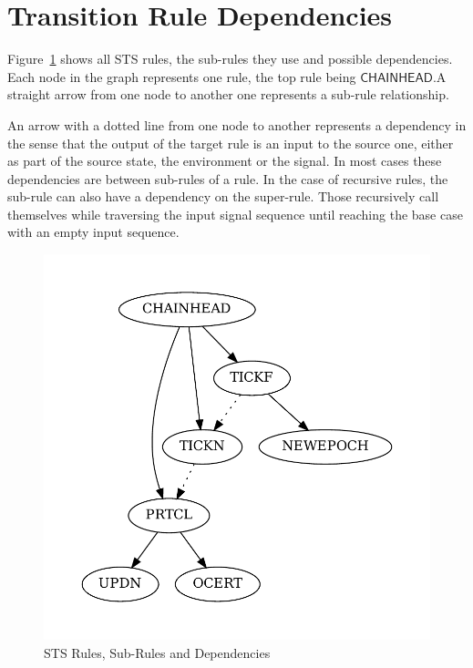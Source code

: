 \section{Transition Rule Dependencies}
\label{sec:sts-rules-overview}

Figure~\ref{fig:sts-rules-dependencies} shows all STS rules, the sub-rules they
use and possible dependencies. Each node in the graph represents one rule, the
top rule being $\mathsf{CHAINHEAD}$.\@ A straight arrow from one node to another
one represents a sub-rule relationship.

An arrow with a dotted line from one node to another represents a dependency in
the sense that the output of the target rule is an input to the source one,
either as part of the source state, the environment or the signal. In most cases
these dependencies are between sub-rules of a rule. In the case of recursive
rules, the sub-rule can also have a dependency on the super-rule. Those
recursively call themselves while traversing the input signal sequence until
reaching the base case with an empty input sequence.

\begin{figure}[htp]
  \centering
  \includegraphics[width=\textwidth]{rules}
  \caption{STS Rules, Sub-Rules and Dependencies}
  \label{fig:sts-rules-dependencies}
\end{figure}

